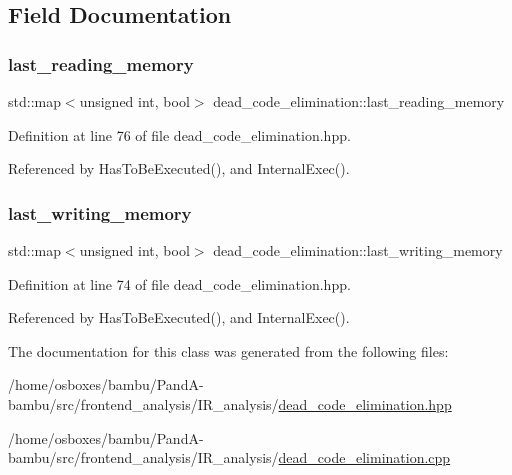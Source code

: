 \subsection{Field Documentation}
\mbox{\label{classdead__code__elimination_a8d9207a50c8c7a7872c13e6f7e9387c1}} 
\subsubsection{\texorpdfstring{last\+\_\+reading\+\_\+memory}{last\_reading\_memory}}
{\footnotesize\ttfamily std\+::map$<$unsigned int, bool$>$ dead\+\_\+code\+\_\+elimination\+::last\+\_\+reading\+\_\+memory\hspace{0.3cm}{\ttfamily [private]}}



Definition at line 76 of file dead\+\_\+code\+\_\+elimination.\+hpp.



Referenced by Has\+To\+Be\+Executed(), and Internal\+Exec().

\mbox{\label{classdead__code__elimination_afc8160e9bee2fd03c06cb05815701f19}} 
\subsubsection{\texorpdfstring{last\+\_\+writing\+\_\+memory}{last\_writing\_memory}}
{\footnotesize\ttfamily std\+::map$<$unsigned int, bool$>$ dead\+\_\+code\+\_\+elimination\+::last\+\_\+writing\+\_\+memory\hspace{0.3cm}{\ttfamily [private]}}



Definition at line 74 of file dead\+\_\+code\+\_\+elimination.\+hpp.



Referenced by Has\+To\+Be\+Executed(), and Internal\+Exec().



The documentation for this class was generated from the following files\+:\begin{DoxyCompactItemize}
\item 
/home/osboxes/bambu/\+Pand\+A-\/bambu/src/frontend\+\_\+analysis/\+I\+R\+\_\+analysis/\hyperlink{dead__code__elimination_8hpp}{dead\+\_\+code\+\_\+elimination.\+hpp}\item 
/home/osboxes/bambu/\+Pand\+A-\/bambu/src/frontend\+\_\+analysis/\+I\+R\+\_\+analysis/\hyperlink{dead__code__elimination_8cpp}{dead\+\_\+code\+\_\+elimination.\+cpp}\end{DoxyCompactItemize}
